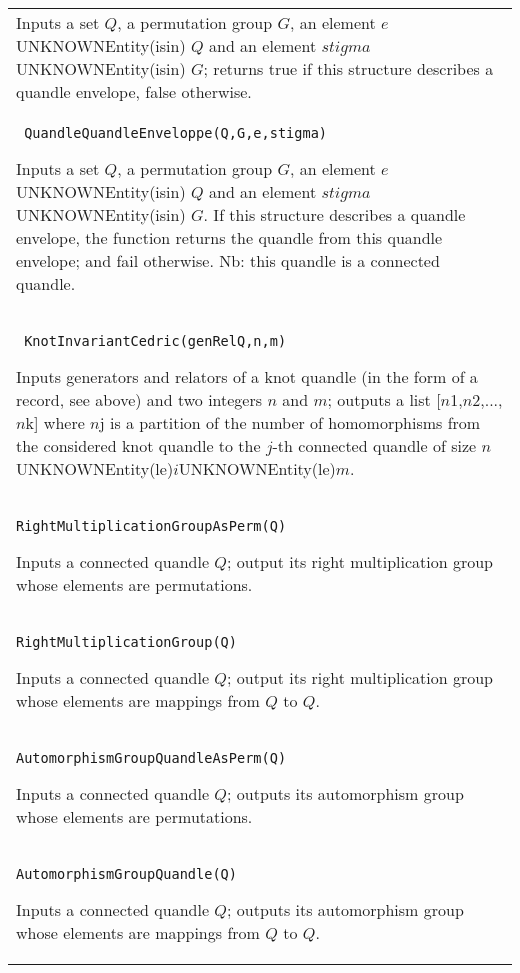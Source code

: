 \documentclass[a4paper,11pt]{report}
\begin{document}
{\begin{center}
\begin{tabular}{|l|}
 Inputs a set $Q$, a permutation group $G$, an element $e$ UNKNOWNEntity(isin) $Q$ and an element $stigma $ UNKNOWNEntity(isin) $G$; returns true if this structure describes a quandle envelope, false
otherwise. \\
 \index{QuandleQuandleEnveloppe} \texttt{ QuandleQuandleEnveloppe(Q,G,e,stigma) } 

 Inputs a set $Q$, a permutation group $G$, an element $e$ UNKNOWNEntity(isin) $Q$ and an element $stigma$ UNKNOWNEntity(isin) $G$. If this structure describes a quandle envelope, the function returns the
quandle from this quandle envelope; and fail otherwise. Nb: this quandle is a
connected quandle. \\
 \index{KnotInvariantCedric} \texttt{ KnotInvariantCedric(genRelQ,n,m) } 

 Inputs generators and relators of a knot quandle (in the form of a record, see
above) and two integers $n$ and $m$; outputs a list [$n$1,$n$2,...,$n$k] where $n$j is a partition of the number of homomorphisms from the considered knot
quandle to the $j$-th connected quandle of size $n$UNKNOWNEntity(le)$i$UNKNOWNEntity(le)$m$. \\
 \index{RightMultiplicationGroupAsPerm} \texttt{RightMultiplicationGroupAsPerm(Q) } 

 Inputs a connected quandle $Q$; output its right multiplication group whose elements are permutations. \\
 \index{RightMultiplicationGroup} \texttt{RightMultiplicationGroup(Q) } 

 Inputs a connected quandle $Q$; output its right multiplication group whose elements are mappings from $Q$ to $Q$. \\
 \index{AutomorphismGroupQuandleAsPerm} \texttt{AutomorphismGroupQuandleAsPerm(Q) } 

 Inputs a connected quandle $Q$; outputs its automorphism group whose elements are permutations. \\
 \index{AutomorphismGroupQuandle} \texttt{AutomorphismGroupQuandle(Q)} 

 Inputs a connected quandle $Q$; outputs its automorphism group whose elements are mappings from $Q$ to $Q$. \\
\end{tabular}\\[2mm]
\end{center}

 }

 
\end{document}
